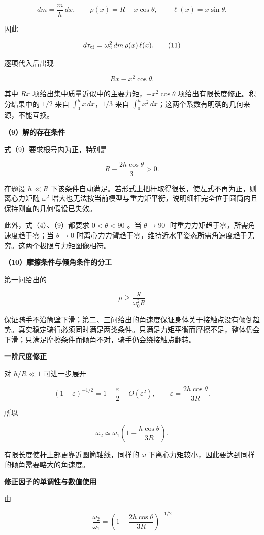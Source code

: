 \documentclass[12pt,a4paper,UTF8]{ctexart}
\begin{document}
\[
dm=\frac mh\,dx,
\qquad
\rho(x)=R-x\cos\theta,
\qquad
\ell(x)=x\sin\theta.
\]

因此

\[
d\tau_{\rm cf}
=\omega_2^2\,dm\,\rho(x)\,\ell(x).
\tag{11}
\]

逐项代入后出现

\[
Rx-x^2\cos\theta.
\]

其中 \(Rx\) 项给出集中质量近似中的主要力矩，\(-x^2\cos\theta\)
项给出有限长度修正。积分结果中的 \(1/2\) 来自
\(\int_0^h x\,dx\)，\(1/3\) 来自
\(\int_0^h x^2\,dx\)；这两个系数有明确的几何来源，不能互换。

\textbf{（9）解的存在条件}

式（9）要求根号内为正，特别是

\[
R-\frac{2h\cos\theta}{3}>0.
\tag{12}
\]

在题设 \(h\ll R\)
下该条件自动满足。若形式上把杆取得很长，使左式不再为正，则离心力矩随
\(\omega^2\)
增大也无法按当前模型与重力矩平衡，说明细杆完全位于圆筒内且保持刚直的几何假设已失效。

此外，式（4）、（9）都要求 \(0<\theta<90^\circ\)。当
\(\theta\to90^\circ\) 时重力力矩趋于零，所需角速度趋于零；当
\(\theta\to0\)
时离心力力臂趋于零，维持近水平姿态所需角速度趋于无穷。这两个极限与力矩图像相符。

\textbf{（10）摩擦条件与倾角条件的分工}

第一问给出的

\[
\mu\geq\frac{g}{\omega_0^2R}
\]

保证骑手不沿筒壁下滑；第二、三问给出的角速度保证身体关于接触点没有倾倒趋势。真实稳定骑行必须同时满足两类条件。只满足力矩平衡而摩擦不足，整体仍会下滑；只满足摩擦条件而倾角不对，骑手仍会绕接触点翻转。

\textbf{一阶尺度修正}

对 \(h/R\ll1\) 可进一步展开

\[
(1-\varepsilon)^{-1/2}
=1+\frac\varepsilon2+O(\varepsilon^2),
\qquad
\varepsilon=\frac{2h\cos\theta}{3R}.
\]

所以

\[
\omega_2
\simeq\omega_1
\left(1+\frac{h\cos\theta}{3R}\right).
\]

有限长度使杆上部更靠近圆筒轴线，同样的 \(\omega\)
下离心力矩较小，因此要达到同样的倾角需要略大的角速度。

\textbf{修正因子的单调性与数值使用}

由

\[
\frac{\omega_2}{\omega_1}
=\left(1-\frac{2h\cos\theta}{3R}\right)^{-1/2}
\]
\end{document}
